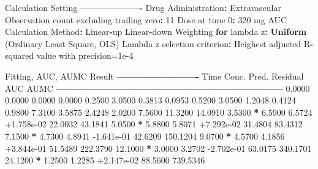 \documentclass[12pt,]{krantz}
\newenvironment{Shaded}{\begin{snugshade}}{\end{snugshade}}
\newcommand{\ControlFlowTok}[1]{\textcolor[rgb]{0.13,0.29,0.53}{\textbf{#1}}}
\newcommand{\DecValTok}[1]{\textcolor[rgb]{0.00,0.00,0.81}{#1}}
\newcommand{\FloatTok}[1]{\textcolor[rgb]{0.00,0.00,0.81}{#1}}
\newcommand{\KeywordTok}[1]{\textcolor[rgb]{0.13,0.29,0.53}{\textbf{#1}}}
\newcommand{\NormalTok}[1]{#1}
\newcommand{\OperatorTok}[1]{\textcolor[rgb]{0.81,0.36,0.00}{\textbf{#1}}}
\newcommand{\StringTok}[1]{\textcolor[rgb]{0.31,0.60,0.02}{#1}}
\begin{document}
\begin{Shaded}
\begin{Highlighting}[]
{{{{{{{{\NormalTok{Calculation Setting}
\OperatorTok{-------------------}
\NormalTok{Drug Administration}\OperatorTok{:}\StringTok{ }\NormalTok{Extravascular}
\NormalTok{Observation count excluding trailing zero}\OperatorTok{:}\StringTok{ }\DecValTok{11}
\NormalTok{Dose at time }\DecValTok{0}\OperatorTok{:}\StringTok{ }\DecValTok{320}\NormalTok{ mg}
\NormalTok{AUC Calculation Method}\OperatorTok{:}\StringTok{ }\NormalTok{Linear}\OperatorTok{-}\NormalTok{up Linear}\OperatorTok{-}\NormalTok{down}
\NormalTok{Weighting }\ControlFlowTok{for}\NormalTok{ lambda z}\OperatorTok{:}\StringTok{ }\KeywordTok{Uniform}\NormalTok{ (Ordinary Least Square, OLS)}
\NormalTok{Lambda z selection criterion}\OperatorTok{:}\StringTok{ }\NormalTok{Heighest adjusted R}\OperatorTok{-}\NormalTok{squared value with precision=}\FloatTok{1e-4}


\NormalTok{Fitting, AUC, AUMC Result}
\OperatorTok{-------------------------}
\StringTok{      }\NormalTok{Time         Conc.      Pred.   Residual       AUC       AUMC}
\OperatorTok{---------------------------------------------------------------------}
\StringTok{     }\FloatTok{0.0000}       \FloatTok{0.0000}                           \FloatTok{0.0000}     \FloatTok{0.0000}
     \FloatTok{0.2500}       \FloatTok{3.0500}                           \FloatTok{0.3813}     \FloatTok{0.0953}
     \FloatTok{0.5200}       \FloatTok{3.0500}                           \FloatTok{1.2048}     \FloatTok{0.4124}
     \FloatTok{0.9800}       \FloatTok{7.3100}                           \FloatTok{3.5875}     \FloatTok{2.4248}
     \FloatTok{2.0200}       \FloatTok{7.5600}                          \FloatTok{11.3200}    \FloatTok{14.0910}
     \FloatTok{3.5300} \OperatorTok{*}\StringTok{     }\FloatTok{6.5900}     \FloatTok{6.5724} \FloatTok{+1.758e-02}    \FloatTok{22.0032}    \FloatTok{43.1841}
     \FloatTok{5.0500} \OperatorTok{*}\StringTok{     }\FloatTok{5.8800}     \FloatTok{5.8071} \FloatTok{+7.292e-02}    \FloatTok{31.4804}    \FloatTok{83.4312}
     \FloatTok{7.1500} \OperatorTok{*}\StringTok{     }\FloatTok{4.7300}     \FloatTok{4.8941} \FloatTok{-1.641e-01}    \FloatTok{42.6209}   \FloatTok{150.1204}
     \FloatTok{9.0700} \OperatorTok{*}\StringTok{     }\FloatTok{4.5700}     \FloatTok{4.1856} \FloatTok{+3.844e-01}    \FloatTok{51.5489}   \FloatTok{222.3790}
    \FloatTok{12.1000} \OperatorTok{*}\StringTok{     }\FloatTok{3.0000}     \FloatTok{3.2702} \FloatTok{-2.702e-01}    \FloatTok{63.0175}   \FloatTok{340.1701}
    \FloatTok{24.1200} \OperatorTok{*}\StringTok{     }\FloatTok{1.2500}     \FloatTok{1.2285} \FloatTok{+2.147e-02}    \FloatTok{88.5600}   \FloatTok{739.5346}

}}}}}}}}
\end{Highlighting}
\end{Shaded}
\end{document}
